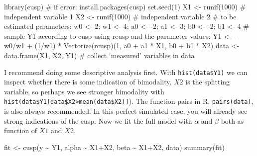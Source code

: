 \documentclass[
  a4paper,
  DIV=11,
  numbers=noendperiod,
  oneside]{scrreprt}
\newenvironment{Shaded}{}{}
\newcommand{\CommentTok}[1]{\textcolor[rgb]{0.42,0.45,0.49}{#1}}
\newcommand{\DecValTok}[1]{\textcolor[rgb]{0.00,0.36,0.77}{#1}}
\newcommand{\FunctionTok}[1]{\textcolor[rgb]{0.44,0.26,0.76}{#1}}
\newcommand{\NormalTok}[1]{\textcolor[rgb]{0.14,0.16,0.18}{#1}}
\newcommand{\OtherTok}[1]{\textcolor[rgb]{0.44,0.26,0.76}{#1}}
\newcommand{\SpecialCharTok}[1]{\textcolor[rgb]{0.00,0.36,0.77}{#1}}
\begin{document}
\begin{Shaded}
\begin{Highlighting}[]
\FunctionTok{library}\NormalTok{(cusp) }\CommentTok{\# if error: install.packages(\textquotesingle{}cusp\textquotesingle{})}
\FunctionTok{set.seed}\NormalTok{(}\DecValTok{1}\NormalTok{)}
\NormalTok{X1 }\OtherTok{\textless{}{-}} \FunctionTok{runif}\NormalTok{(}\DecValTok{1000}\NormalTok{) }\CommentTok{\# independent variable 1}
\NormalTok{X2 }\OtherTok{\textless{}{-}} \FunctionTok{runif}\NormalTok{(}\DecValTok{1000}\NormalTok{) }\CommentTok{\# independent variable 2}
\CommentTok{\# to be estimated parameters:}
\NormalTok{w0 }\OtherTok{\textless{}{-}} \DecValTok{2}\NormalTok{; w1 }\OtherTok{\textless{}{-}} \DecValTok{4}\NormalTok{; a0 }\OtherTok{\textless{}{-}} \SpecialCharTok{{-}}\DecValTok{2}\NormalTok{; a1 }\OtherTok{\textless{}{-}} \DecValTok{3}\NormalTok{; b0 }\OtherTok{\textless{}{-}} \SpecialCharTok{{-}}\DecValTok{2}\NormalTok{; b1 }\OtherTok{\textless{}{-}} \DecValTok{4} 
\CommentTok{\# sample Y1 according to cusp using rcusp and the parameter values:}
\NormalTok{Y1 }\OtherTok{\textless{}{-}} \SpecialCharTok{{-}}\NormalTok{w0}\SpecialCharTok{/}\NormalTok{w1 }\SpecialCharTok{+}\NormalTok{ (}\DecValTok{1}\SpecialCharTok{/}\NormalTok{w1) }\SpecialCharTok{*} \FunctionTok{Vectorize}\NormalTok{(rcusp)(}\DecValTok{1}\NormalTok{, a0 }\SpecialCharTok{+}\NormalTok{ a1 }\SpecialCharTok{*}\NormalTok{ X1, b0 }\SpecialCharTok{+}\NormalTok{ b1 }\SpecialCharTok{*}\NormalTok{ X2) }
\NormalTok{data }\OtherTok{\textless{}{-}} \FunctionTok{data.frame}\NormalTok{(X1, X2, Y1) }\CommentTok{\# collect ‘measured’ variables in data}
\end{Highlighting}
\end{Shaded}

I recommend doing some descriptive analysis first. With
\texttt{hist(data\$Y1)} we can inspect whether there is some indication
of bimodality. \(X2\) is the splitting variable, so perhaps we see
stronger bimodality with
\texttt{hist(data\$Y1{[}data\$X2\textgreater{}mean(data\$X2){]}}). The
function pairs in R, \texttt{pairs(data)}, is also always recommended.
In this perfect simulated case, you will already see strong indications
of the cusp. Now we fit the full model with \(\alpha\) and \(\beta\)
both as function of \(X1\) and \(X2\).

\begin{Shaded}
\begin{Highlighting}[]
\NormalTok{fit }\OtherTok{\textless{}{-}} \FunctionTok{cusp}\NormalTok{(y }\SpecialCharTok{\textasciitilde{}}\NormalTok{ Y1, alpha }\SpecialCharTok{\textasciitilde{}}\NormalTok{ X1}\SpecialCharTok{+}\NormalTok{X2, beta }\SpecialCharTok{\textasciitilde{}}\NormalTok{ X1}\SpecialCharTok{+}\NormalTok{X2, data) }
\FunctionTok{summary}\NormalTok{(fit) }
\end{Highlighting}
\end{Shaded}
\end{document}
